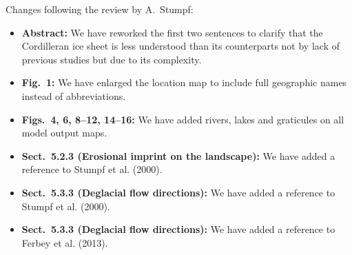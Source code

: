 Changes following the review by A.~Stumpf:

\begin{itemize}

    \item \textbf{Abstract:}
    We have reworked the first two sentences to clarify that the Cordilleran
    ice sheet is less understood than its counterparts not by lack of previous
    studies but due to its complexity.

    \item \textbf{Fig.~1:}
    We have enlarged the location map to include full geographic names instead
    of abbreviations.

    \item \textbf{Figs.~4, 6, 8--12, 14--16:}
    We have added rivers, lakes and graticules on all model output maps.

    \item \textbf{Sect.~5.2.3 (Erosional imprint on the landscape):}
    We have added a reference to Stumpf et al. (2000).

    \item \textbf{Sect.~5.3.3 (Deglacial flow directions):}
    We have added a reference to Stumpf et al. (2000).

    \item \textbf{Sect.~5.3.3 (Deglacial flow directions):}
    We have added a reference to Ferbey et al. (2013).

\end{itemize}


